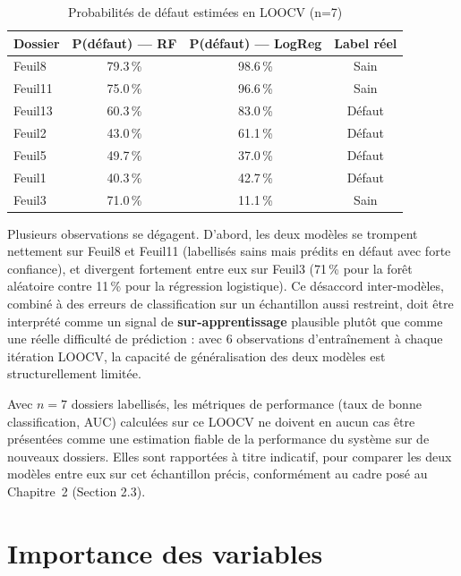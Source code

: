 \begin{table}[h]
\centering
\small
\begin{tabular}{@{}lccc@{}}
\toprule
\textbf{Dossier} & \textbf{P(défaut) — RF} & \textbf{P(défaut) — LogReg} & \textbf{Label réel} \\
\midrule
Feuil8  & 79.3\,\% & 98.6\,\% & Sain \\
Feuil11 & 75.0\,\% & 96.6\,\% & Sain \\
Feuil13 & 60.3\,\% & 83.0\,\% & Défaut \\
Feuil2  & 43.0\,\% & 61.1\,\% & Défaut \\
Feuil5  & 49.7\,\% & 37.0\,\% & Défaut \\
Feuil1  & 40.3\,\% & 42.7\,\% & Défaut \\
Feuil3  & 71.0\,\% & 11.1\,\% & Sain \\
\bottomrule
\end{tabular}
\caption{Probabilités de défaut estimées en LOOCV (n=7)}
\label{tab:proba-defaut}
\end{table}
\label{tab:seuil-defaut}

Plusieurs observations se dégagent. D'abord, les deux modèles se trompent nettement sur Feuil8
et Feuil11 (labellisés sains mais prédits en défaut avec forte confiance), et divergent fortement
entre eux sur Feuil3 (71\,\% pour la forêt aléatoire contre 11\,\% pour la régression logistique).
Ce désaccord inter-modèles, combiné à des erreurs de classification sur un échantillon aussi
restreint, doit être interprété comme un signal de \textbf{sur-apprentissage} plausible plutôt
que comme une réelle difficulté de prédiction : avec 6 observations d'entraînement à chaque
itération LOOCV, la capacité de généralisation des deux modèles est structurellement limitée.

\begin{limite}
Avec $n=7$ dossiers labellisés, les métriques de performance (taux de bonne classification, AUC)
calculées sur ce LOOCV ne doivent en aucun cas être présentées comme une estimation fiable de la
performance du système sur de nouveaux dossiers. Elles sont rapportées à titre indicatif, pour
comparer les deux modèles entre eux sur cet échantillon précis, conformément au cadre posé au
Chapitre~2 (Section 2.3).
\end{limite}

\section{Importance des variables}

